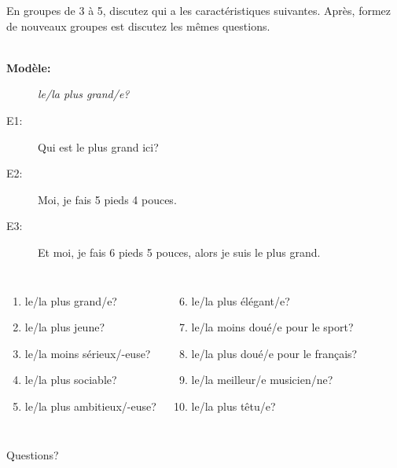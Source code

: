 \documentclass{beamer}
\begin{document}
  \begin{frame}{}
    En groupes de 3 à 5, discutez qui a les caractéristiques suivantes.
    Après, formez de nouveaux groupes est discutez les mêmes questions. \\
     \\
    \begin{description}
      \item[\textbf{Modèle:}] \emph{le/la plus grand/e?}
      \item[E1:] Qui est le plus grand ici?
      \item[E2:] Moi, je fais 5 pieds 4 pouces.
      \item[E3:] Et moi, je fais 6 pieds 5 pouces, alors je suis le plus grand.
    \end{description}
    \begin{columns}[t]
        \begin{enumerate}
          \item le/la plus grand/e?
          \item le/la plus jeune?
          \item le/la moins sérieux/-euse?
          \item le/la plus sociable?
          \item le/la plus ambitieux/-euse?
        \end{enumerate}
        \begin{enumerate}
          \setcounter{enumi}{5}
          \item le/la plus élégant/e?
          \item le/la moins doué/e pour le sport?
          \item le/la plus doué/e pour le français?
          \item le/la meilleur/e musicien/ne?
          \item le/la plus têtu/e?
        \end{enumerate}
    \end{columns}
  \end{frame}

  \begin{frame}{}
    \begin{center}
      \Large Questions?
    \end{center}
  \end{frame}
\end{document}
